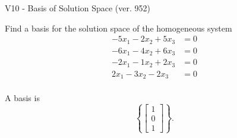 \begin{exercise}
  \begin{exerciseTitle}V10 - Basis of Solution Space (ver. 952)\end{exerciseTitle}
  \begin{exerciseStatement}
    Find a basis for the solution space of the homogeneous system 
\begin{align*}
 -5 x_ 1 -2 x_ 2 + 5 x_ 3 &= 0  \\ 
  -6 x_ 1 -4 x_ 2 + 6 x_ 3 &= 0  \\ 
  -2 x_ 1 -1 x_ 2 + 2 x_ 3 &= 0  \\ 
  2 x_ 1 -3 x_ 2 -2 x_ 3 &= 0  \\ 
 \end{align*}


 
  \end{exerciseStatement}

  \begin{exerciseAnswer}
   A basis is   
\[\left\{\left[\begin{array}{c}
1 \\
0 \\
1
\end{array}\right]\right\}.\]

  


  \end{exerciseAnswer}
\end{exercise}